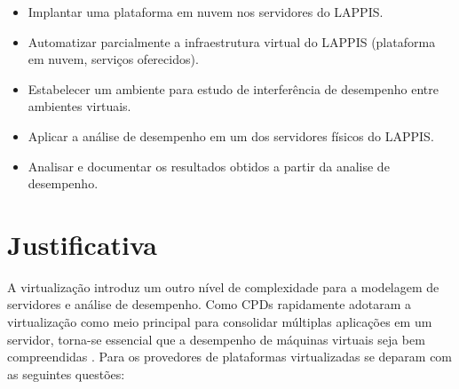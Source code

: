 \begin{itemize}
\item Implantar uma plataforma em nuvem nos servidores do LAPPIS.
\item Automatizar parcialmente a infraestrutura virtual do LAPPIS (plataforma em nuvem, serviços oferecidos).
\item Estabelecer um ambiente para estudo de interferência de desempenho entre ambientes virtuais.
\item Aplicar a análise de desempenho em um dos servidores físicos do LAPPIS.
\item Analisar e documentar os resultados obtidos a partir da analise de desempenho.


\end{itemize}

\section{Justificativa}
A virtualização introduz um outro nível de complexidade para a modelagem de servidores e análise de desempenho. Como CPDs rapidamente adotaram a virtualização como meio principal para consolidar múltiplas aplicações em um servidor, torna-se essencial que a desempenho de máquinas virtuais seja bem compreendidas \cite{ticko2010}. Para  os provedores de plataformas virtualizadas se deparam com as seguintes questões:

